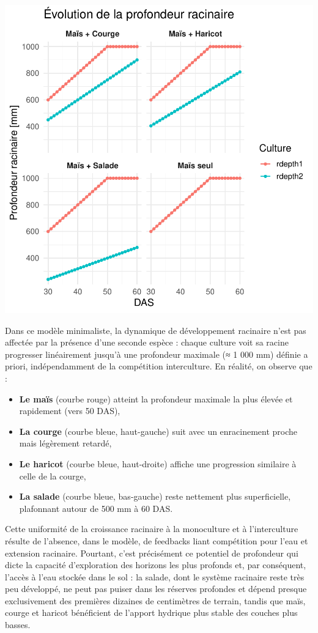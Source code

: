 \documentclass[
]{article}
\begin{document}
\begin{center}\includegraphics[width=0.7\linewidth]{Rapport_final_Maxime_CORNEZ_files/figure-latex/graphe-rdepth-1} \end{center}

Dans ce modèle minimaliste, la dynamique de développement racinaire
n'est pas affectée par la présence d'une seconde espèce : chaque culture
voit sa racine progresser linéairement jusqu'à une profondeur maximale
(≈ 1 000 mm) définie a priori, indépendamment de la compétition
interculture. En réalité, on observe que :

\begin{itemize}
\item
  \textbf{Le maïs} (courbe rouge) atteint la profondeur maximale la plus
  élevée et rapidement (vers 50 DAS),
\item
  \textbf{La courge} (courbe bleue, haut-gauche) suit avec un
  enracinement proche mais légèrement retardé,
\item
  \textbf{Le haricot} (courbe bleue, haut-droite) affiche une
  progression similaire à celle de la courge,
\item
  \textbf{La salade} (courbe bleue, bas-gauche) reste nettement plus
  superficielle, plafonnant autour de 500 mm à 60 DAS.
\end{itemize}

Cette uniformité de la croissance racinaire à la monoculture et à
l'interculture résulte de l'absence, dans le modèle, de feedbacks liant
compétition pour l'eau et extension racinaire. Pourtant, c'est
précisément ce potentiel de profondeur qui dicte la capacité
d'exploration des horizons les plus profonds et, par conséquent, l'accès
à l'eau stockée dans le sol : la salade, dont le système racinaire reste
très peu développé, ne peut pas puiser dans les réserves profondes et
dépend presque exclusivement des premières dizaines de centimètres de
terrain, tandis que maïs, courge et haricot bénéficient de l'apport
hydrique plus stable des couches plus basses.
\end{document}
